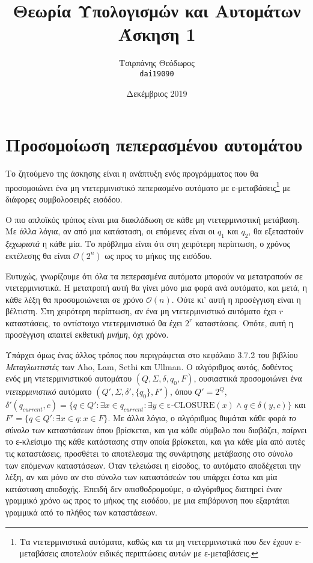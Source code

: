 \documentclass{article}
\title{Θεωρία Υπολογισμών και Αυτομάτων\\ Άσκηση 1}
\author{Τσιρπάνης Θεόδωρος\\ \texttt{dai19090}}
\date{Δεκέμβριος 2019}
\begin{document}

\maketitle

\section{Προσομοίωση πεπερασμένου αυτομάτου}

Το ζητούμενο της άσκησης είναι η ανάπτυξη ενός προγράμματος που θα προσομοιώνει ένα μη ντετερμινιστικό πεπερασμένο αυτόματο με ε-μεταβάσεις\footnote{Τα ντετερμινιστικά αυτόματα, καθώς και τα μη ντετερμινιστικά που δεν έχουν ε-μεταβάσεις αποτελούν ειδικές περιπτώσεις αυτών με ε-μεταβάσεις.} με διάφορες συμβολοσειρές εισόδου.

Ο πιο απλοϊκός τρόπος είναι μια διακλάδωση σε κάθε μη ντετερμινιστική μετάβαση. Με άλλα λόγια, αν από μια κατάσταση, οι επόμενες είναι οι $q_1$ και $q_2$, θα εξεταστούν \emph{ξεχωριστά} η κάθε μία. Το πρόβλημα είναι ότι στη χειρότερη περίπτωση, ο χρόνος εκτέλεσης θα είναι $\mathcal{O}(2^n)$ ως προς το μήκος της εισόδου.

Ευτυχώς, γνωρίζουμε ότι όλα τα πεπερασμένα αυτόματα μπορούν να μετατραπούν σε ντετερμινιστικά. Η μετατροπή αυτή θα γίνει μόνο μια φορά ανά αυτόματο, και μετά, η κάθε λέξη θα προσομοιώνεται σε χρόνο $\mathcal{O}(n)$. Ούτε κι' αυτή η προσέγγιση είναι η βέλτιστη. Στη χειρότερη περίπτωση, αν ένα μη ντετερμινιστικό αυτόματο έχει $r$ καταστάσεις, το αντίστοιχο ντετερμινιστικό θα έχει $2^r$ καταστάσεις. Οπότε, αυτή η προσέγγιση απαιτεί εκθετική \emph{μνήμη}, όχι χρόνο.

Υπάρχει όμως ένας άλλος τρόπος που περιγράφεται στο κεφάλαιο 3.7.2 του βιβλίου \textit{Μεταγλωττιστές} των Aho, Lam, Sethi και Ullman. Ο αλγόριθμος αυτός, δοθέντος ενός μη ντετερμινιστικού αυτομάτου $(Q, \Sigma, \delta, q_0, F)$, ουσιαστικά προσομοιώνει ένα \emph{ντετερμινιστικό} αυτόματο $(Q', \Sigma, \delta', \{q_0\}, F')$, όπου $Q' = 2^Q$, $\delta'(q_{current}, c) = \{q \in Q' : \exists x \in q_{current} : \exists y \in \text{ε-CLOSURE}(x) \land q \in \delta(y, c)\}$ και $F' = \{q \in Q' : \exists x \in q : x \in F\}$. Με άλλα λόγια, ο αλγόριθμος θυμάται κάθε φορά \emph{το σύνολο} των καταστάσεων όπου βρίσκεται, και για κάθε σύμβολο που διαβάζει, παίρνει το ε-κλείσιμο της κάθε κατάστασης στην οποία βρίσκεται, και για κάθε μία από αυτές τις καταστάσεις, προσθέτει το αποτέλεσμα της συνάρτησης μετάβασης στο σύνολο των επόμενων καταστάσεων. Όταν τελειώσει η είσοδος, το αυτόματο αποδέχεται την λέξη, αν και μόνο αν στο σύνολο των καταστάσεών του υπάρχει έστω και μία κατάσταση αποδοχής. Επειδή δεν οπισθοδρομούμε, ο αλγόριθμος διατηρεί έναν γραμμικό χρόνο ως προς το μήκος της εισόδου, με μια επιβάρυνση που εξαρτάται γραμμικά από το πλήθος των καταστάσεων.
\end{document}
